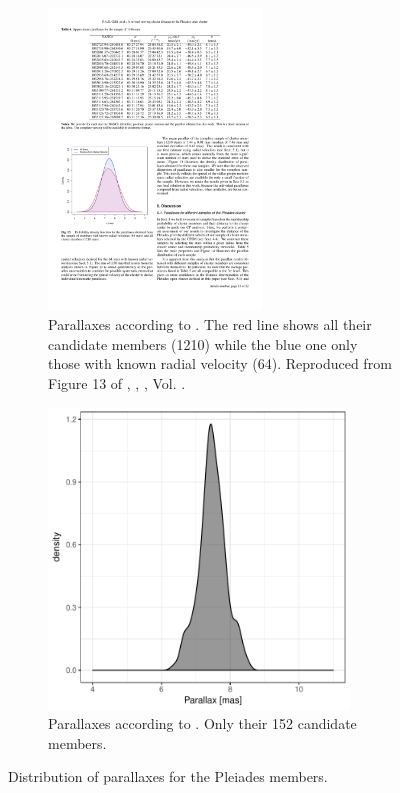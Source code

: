 \begin{figure}[ht!]
    \centering
    \begin{subfigure}[t]{\textwidth}
    \centering
        \includegraphics[height=8cm]{background/Figures/F13_Galli2017.pdf}
        \caption{Parallaxes according to \citet{Galli2017}. The red line shows all their candidate members (1210) while the blue one only those with known radial velocity (64). Reproduced from Figure 13 of \citet{Galli2017}, \textit{}, , Vol. .}
        \label{fig:parallaxPhillip}
    \end{subfigure}
    \begin{subfigure}[t]{\textwidth}
    \centering
       \includegraphics[height=8cm]{background/Figures/Parallax_GaiaCol2017.pdf}
        \caption{Parallaxes according to \citet{2017A&A...601A..19G}. Only their 152 candidate members.}
        \label{fig:parallaxTGAS} 
    \end{subfigure}
    \caption{Distribution of parallaxes for the Pleiades members.}
\end{figure}



